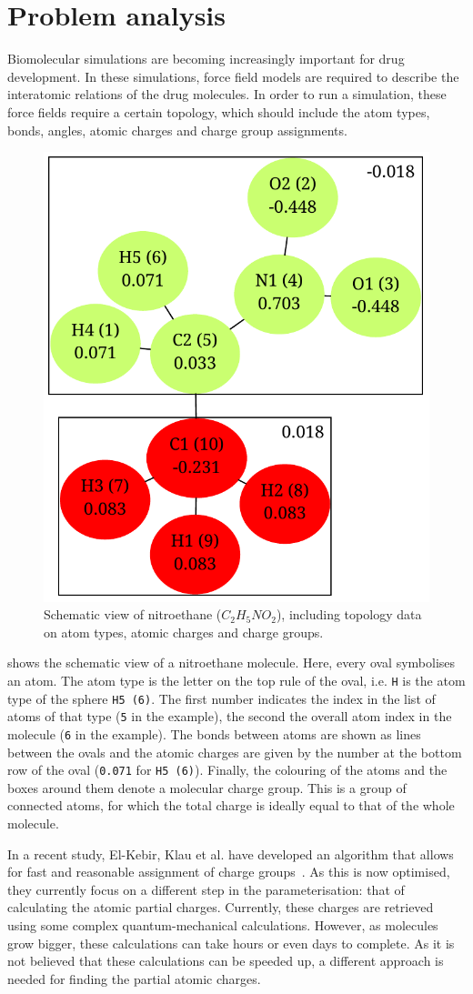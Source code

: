 \chapter{Problem analysis}

Biomolecular simulations are becoming increasingly important for drug development. In these simulations, force field models are required to describe the interatomic relations of the drug molecules. In order to run a simulation, these force fields require a certain topology, which should include the atom types, bonds, angles, atomic charges and charge group assignments.

\begin{figure}[h!]
\begin{center}
\includegraphics[width=.4\textwidth]{img/partial_charges.pdf}
\caption{Schematic view of nitroethane ($C_{2}H_{5}NO_{2}$), including topology data on atom types, atomic charges and charge groups.}
\end{center}
\end{figure}

 shows the schematic view of a nitroethane molecule. Here, every oval symbolises an atom. The atom type is the letter on the top rule of the oval, i.e. \verb|H| is the atom type of the sphere \verb|H5 (6)|. The first number indicates the index in the list of atoms of that type (\verb|5| in the example), the second the overall atom index in the molecule (\verb|6| in the example). The bonds between atoms are shown as lines between the ovals and the atomic charges are given by the number at the bottom row of the oval (\verb|0.071| for \verb|H5 (6)|). Finally, the colouring of the atoms and the boxes around them denote a molecular charge group. This is a group of connected atoms, for which the total charge is ideally equal to that of the whole molecule.

In a recent study, El-Kebir, Klau et al. have developed an algorithm that allows for fast and reasonable assignment of charge groups~\cite{canzar2012charge}. As this is now optimised, they currently focus on a different step in the parameterisation: that of calculating the atomic partial charges. Currently, these charges are retrieved using some complex quantum-mechanical calculations. However, as molecules grow bigger, these calculations can take hours or even days to complete. As it is not believed that these calculations can be speeded up, a different approach is needed for finding the partial atomic charges.


